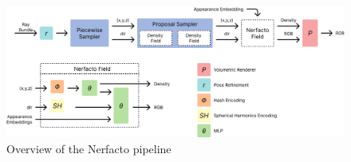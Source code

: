 \begin{figure}[!h]
    \centering
    \includegraphics[width=1.0\textwidth]{figures/nerfacto-pipeline-overview.png}
    \caption{Overview of the Nerfacto pipeline}
    \label{fig:nerfacto-pipeline-overview}
\end{figure}